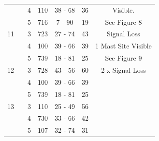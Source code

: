 \documentclass[a4paper,12pt]{article}
\begin{document}
\begin{tabular}{|c|c|c|c|c|c|c|}
 	&		&	 4	&	110	&	38 - 68	&	36	&	Visible.	  	\\
 	&		&	 5	&	716	&	 7 - 90	&	19	&	See Figure 8	\\
\hline	
11	&		&	 3	&	723	&	27 - 74	&	43	& Signal Loss \\
 	&		&	 4	&	100	&	39 - 66	&	39	& 1 Mast Site Visible \\
 	&		&	 5	&	739	&	18 - 81	&	25	& See Figure 9	\\
\hline	
12	&		&	 3	&	728	&	43 - 56	&	60	&2 x Signal Loss \\
 	&		&	 4	&	100	&	39 - 66	&	39	&		\\
 	&		&	 5	&	739	&	18 - 81	&	25	&		\\
\hline	
13	&		&	 3	&	110	&	25 - 49	&	56	&	 	\\
 	&		&	 4	&	730	&	33 - 66	&	42	&		\\
 	&		&	 5	&	107	&	32 - 74	&	31	&		\\
\hline	
\end{tabular}
\end{document}
